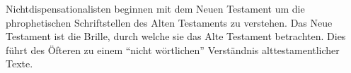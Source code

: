 \documentclass{../../inc/mybib}
\begin{document}
Nichtdispensationalisten beginnen mit dem Neuen Testament um die phrophetischen Schriftstellen des Alten Testaments zu verstehen. Das Neue Testament ist die Brille, durch welche sie das Alte Testament betrachten. Dies führt des Öfteren zu einem \enquote{nicht wörtlichen} Verständnis alttestamentlicher Texte.
    
\end{document}
